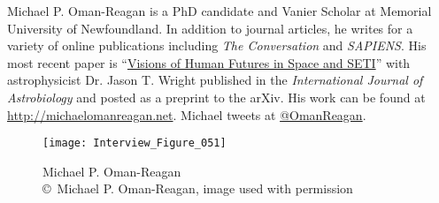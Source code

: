 Michael P. Oman-Reagan is a PhD candidate and Vanier Scholar at Memorial University of Newfoundland. In addition to journal articles, he writes for a variety of online publications including \emph{The Conversation} and \emph{SAPIENS}. His most recent paper is “\href{<https://arxiv.org/abs/1708.05318>}{Visions of Human Futures in Space and SETI}” with astrophysicist Dr. Jason T. Wright published in the \emph{International Journal of Astrobiology} and posted as a preprint to the arXiv. His work can be found at \href{<http://michaelomanreagan.net>}{http://michaelomanreagan.net}. Michael tweets at \href{<twitter.com/OmanReagan>}{@OmanReagan}.

\begin{figure}[!htb]
	\texttt{[image: Interview\_Figure\_051]}
	\centering
	\caption{Michael P. Oman-Reagan
		{\normalfont\scriptsize \\ \copyright\ Michael P. Oman-Reagan, image used with permission
	}}
	\label{Interview_Figure_051}
\end{figure}

